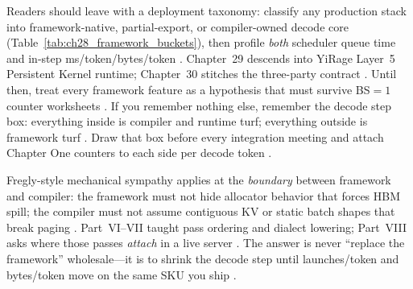 Readers should leave with a deployment taxonomy: classify any production stack into framework-native, partial-export, or compiler-owned decode core (Table~\ref{tab:ch28_framework_buckets}), then profile \emph{both} scheduler queue time and in-step ms/token/bytes/token \citep{patel2025llminference,taxbreak2026,memoryfloor2026,yirage2026}. Chapter~29 descends into YiRage Layer~5 Persistent Kernel runtime; Chapter~30 stitches the three-party contract \citep{yirage2026,chen2020compilerbasedhardw,dlbook}. Until then, treat every framework feature as a hypothesis that must survive BS${=}1$ counter worksheets \citep{kwon2023vllm,patel2025llminference,taxbreak2026,memoryfloor2026}. If you remember nothing else, remember the decode step box: everything inside is compiler and runtime turf; everything outside is framework turf \citep{yirage2026,chen2020compilerbasedhardw,patel2025llminference,kwon2023vllm,taxbreak2026,memoryfloor2026,dlbook}. Draw that box before every integration meeting and attach Chapter One counters to each side per decode token \citep{patel2025llminference,yirage2026,chen2020compilerbasedhardw,kwon2023vllm,taxbreak2026,memoryfloor2026,dlbook}.

Fregly-style mechanical sympathy applies at the \emph{boundary} between framework and compiler: the framework must not hide allocator behavior that forces HBM spill; the compiler must not assume contiguous KV or static batch shapes that break paging \citep{kwon2023vllm,yirage2026,chen2020compilerbasedhardw,memoryfloor2026,taxbreak2026,patel2025llminference,dao2022flashattention,nvidia2024cudagraphs,dlbook}. Part~VI--VII taught pass ordering and dialect lowering; Part~VIII asks where those passes \emph{attach} in a live server \citep{chen2020compilerbasedhardw,yirage2026,patel2025llminference,kwon2023vllm,taxbreak2026,memoryfloor2026,liu2024deepseekv3,semianalysis2024tma,amd2024xdna,amd2024aie,dlbook}. The answer is never ``replace the framework'' wholesale---it is to shrink the decode step until launches/token and bytes/token move on the same SKU you ship \citep{taxbreak2026,memoryfloor2026,yirage2026,chen2020compilerbasedhardw,patel2025llminference,kwon2023vllm,dao2022flashattention,dao2023flashdecoding,nvidia2024cudagraphs,dlbook}.

